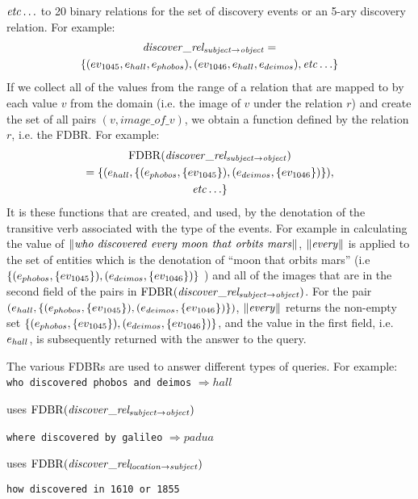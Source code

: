 \documentclass[../main.tex]{subfiles}
\begin{document}
\begin{refsection}
\noindent $\mathit{etc}\ldots$ to 20 binary relations for  the set of discovery events or an 5-ary discovery relation. For example:
\begin{multline*}
	\mathit{discover\_rel_{subject \rightarrow object}} = \\ \{(ev_{\mathrm{1045}}, e_{hall}, e_{phobos}), (ev_{\mathrm{1046}}, e_{hall}, e_{deimos}), \mathit{etc}\ldots\}
\end{multline*}
If we collect all of the values from the range of a relation that are mapped to by each value $v$ from the domain (i.e. the image of $v$ under the relation $r$) and create the set of all pairs $(v, image\_of\_v)$, we obtain a function defined by the relation $r$, i.e. the FDBR. For example:
\begin{multline*}
	\mathrm{FDBR}({\mathit{discover\_rel_{subject \rightarrow object}}}) \\ = \{ ( e_{hall}, \{(e_{phobos}, \{ev_{\mathrm{1045}}\}), (e_{deimos}, \{ev_{\mathrm{1046}}\}) \}),\\ \mathit{etc}\ldots\}
\end{multline*}
It is these functions that are created, and used, by the denotation of the transitive verb associated with the type of the events. For example in calculating the value of $\meaningof{who\ discovered\ every\ moon\ that\ orbits\ mars}$, $\lVert \mathit{every} \rVert$ is applied to the set of entities which is the denotation of ``moon that orbits mars'' (i.e $\{ (e_{phobos}, \{ev_{\mathrm{1045}}\}), (e_{deimos}, \{ev_{\mathrm{1046}}\})\}$ ) and all of the images that are in the second field of the pairs in $\mathrm{FDBR}({\mathit{discover\_rel_{subject \rightarrow object}}})$. For the pair $(e_{hall}, \{(e_{phobos}, \{ev_{\mathrm{1045}}\}), (e_{deimos}, \{ev_{\mathrm{1046}}\})\})$, $\lVert \mathit{every} \rVert$ returns the non-empty set $\{(e_{phobos}, \{ev_{\mathrm{1045}}\}), (e_{deimos}, \{ev_{\mathrm{1046}}\})\}$, and the value in the first field, i.e. $e_{hall}$, is subsequently returned with the answer to the query.

The various FDBRs are used to answer different types of queries. For example: \\

\noindent \texttt{who discovered phobos and deimos} $\Rightarrow hall$

uses $\mathrm{FDBR}({\mathit{discover\_rel_{subject \rightarrow object}}})$

\noindent \texttt{where discovered by galileo} $\Rightarrow \mathit{padua}$

uses $\mathrm{FDBR}({\mathit{discover\_rel_{location \rightarrow subject}}})$

\noindent \texttt{how discovered in 1610 or 1855}


\end{refsection}
\end{document}
